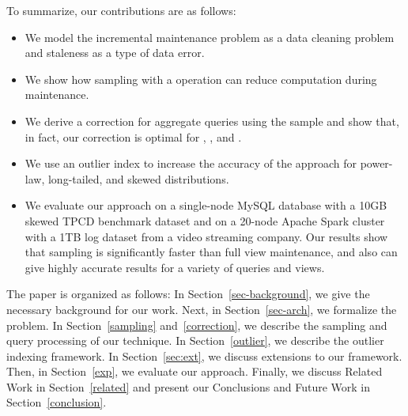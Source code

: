 To summarize, our contributions are as follows:
\begin{itemize}\vspace{-.45em}
\item We model the incremental maintenance problem as a data cleaning problem and staleness as a type of data error.\vspace{-.45em}
\item We show how sampling with a \hashop operation can reduce computation during maintenance. \vspace{-.45em}
\item We derive a correction for aggregate queries using the sample and show that, in fact, our correction is optimal for \sumfunc, \countfunc, and \avgfunc. \vspace{-.45em}
\item We use an outlier index to increase the accuracy of the approach for power-law, long-tailed, and skewed distributions.\vspace{-.45em}
\item We evaluate our approach on a single-node MySQL database with a 10GB skewed TPCD benchmark dataset and on a 20-node Apache Spark cluster with a 1TB log dataset from a video streaming company. Our results show that sampling is significantly faster than full view maintenance, and also can give highly accurate results for a variety of queries and views.\vspace{-.45em}
\end{itemize}

The paper is organized as follows: 
In Section~\ref{sec-background}, we give the necessary background for our work.
Next, in Section~\ref{sec-arch}, we formalize the problem.
In Section~\ref{sampling} and~\ref{correction}, we describe the sampling and query processing of our technique.
In Section~\ref{outlier}, we describe the outlier indexing framework.
In Section~\ref{sec:ext}, we discuss extensions to our framework.
Then, in Section~\ref{exp}, we evaluate our approach.
Finally, we discuss Related Work in Section~\ref{related} and present our Conclusions and Future Work in Section~\ref{conclusion}.
